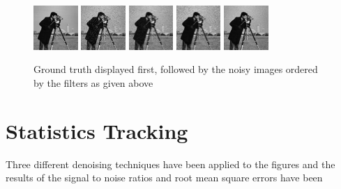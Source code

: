 \documentclass{article}
\begin{document}
 \begin{figure}[H]
      \centering
      \includegraphics[width =0.15\textwidth]{../images/camera_truth}
      \includegraphics[width =0.15\textwidth]{../images/camera_noisy1}
      \includegraphics[width =0.15\textwidth]{../images/camera_noisy2}
      \includegraphics[width =0.15\textwidth]{../images/camera_noisy3}
      \includegraphics[width =0.15\textwidth]{../images/camera_noisy4}
      \caption{Ground truth displayed first, followed by the noisy
        images ordered by the filters as given above}
    \end{figure}   

  \section{Statistics Tracking}
  Three different denoising techniques have been applied to the
  figures and the results of the signal to noise ratios and root mean
  square errors have been
\newpage
\printbibliography
\end{document}
